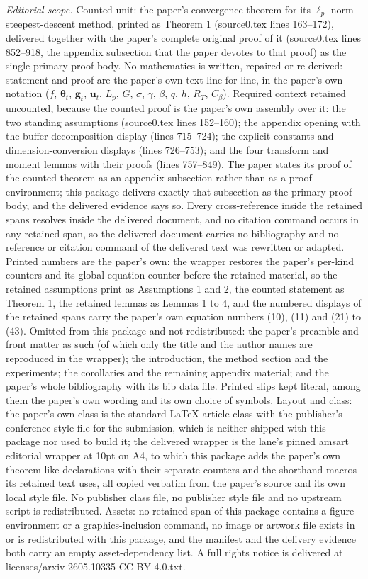 \documentclass[10pt,a4paper]{amsart}
\begin{document}
\noindent\textit{Editorial scope.} Counted unit: the paper's convergence theorem for its $\ell_p$-norm steepest-descent method, printed as Theorem 1 (source0.tex lines 163--172), delivered together with the paper's complete original proof of it (source0.tex lines 852--918, the appendix subsection that the paper devotes to that proof) as the single primary proof body. No mathematics is written, repaired or re-derived: statement and proof are the paper's own text line for line, in the paper's own notation ($f$, $\bm{\theta}_t$, $\bar{\mathbf{g}}_t$, $\mathbf{u}_t$, $L_p$, $G$, $\sigma$, $\gamma$, $\beta$, $q$, $h$, $R_T$, $C_\beta$). Required context retained uncounted, because the counted proof is the paper's own assembly over it: the two standing assumptions (source0.tex lines 152--160); the appendix opening with the buffer decomposition display (lines 715--724); the explicit-constants and dimension-conversion displays (lines 726--753); and the four transform and moment lemmas with their proofs (lines 757--849). The paper states its proof of the counted theorem as an appendix subsection rather than as a proof environment; this package delivers exactly that subsection as the primary proof body, and the delivered evidence says so. Every cross-reference inside the retained spans resolves inside the delivered document, and no citation command occurs in any retained span, so the delivered document carries no bibliography and no reference or citation command of the delivered text was rewritten or adapted. Printed numbers are the paper's own: the wrapper restores the paper's per-kind counters and its global equation counter before the retained material, so the retained assumptions print as Assumptions 1 and 2, the counted statement as Theorem 1, the retained lemmas as Lemmas 1 to 4, and the numbered displays of the retained spans carry the paper's own equation numbers (10), (11) and (21) to (43). Omitted from this package and not redistributed: the paper's preamble and front matter as such (of which only the title and the author names are reproduced in the wrapper); the introduction, the method section and the experiments; the corollaries and the remaining appendix material; and the paper's whole bibliography with its bib data file. Printed slips kept literal, among them the paper's own wording and its own choice of symbols. Layout and class: the paper's own class is the standard LaTeX article class with the publisher's conference style file for the submission, which is neither shipped with this package nor used to build it; the delivered wrapper is the lane's pinned amsart editorial wrapper at 10pt on A4, to which this package adds the paper's own theorem-like declarations with their separate counters and the shorthand macros its retained text uses, all copied verbatim from the paper's source and its own local style file. No publisher class file, no publisher style file and no upstream script is redistributed. Assets: no retained span of this package contains a figure environment or a graphics-inclusion command, no image or artwork file exists in or is redistributed with this package, and the manifest and the delivery evidence both carry an empty asset-dependency list. A full rights notice is delivered at licenses/arxiv-2605.10335-CC-BY-4.0.txt.
\setcounter{equation}{9}
\end{document}
